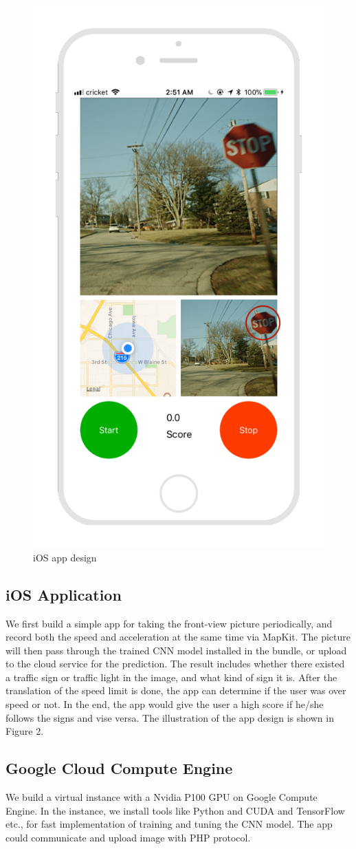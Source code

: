 \documentclass{article}
\begin{document}
\begin{figure}
\begin{minipage}{.4\textwidth}
    \includegraphics[width=.6\linewidth]{iOS_design.png}
    \caption{iOS app design}
    \label{fig:fig_2}
  \end{minipage}
\end{figure}
\subsection{iOS Application}
We first build a simple app for taking the front-view picture periodically, and record both the speed and acceleration at the same time via MapKit. The picture will then pass through the trained CNN model installed in the bundle, or upload to the cloud service for the prediction. The result includes whether there existed a traffic sign or traffic light in the image, and what kind of sign it is. After the translation of the speed limit is done, the app can determine if the user was over speed or not. In the end, the app would give the user a high score if he/she follows the signs and vise versa. The illustration of the app design is shown in Figure 2.

\subsection{Google Cloud Compute Engine}
We build a virtual instance with a Nvidia P100 GPU on Google Compute Engine. In the instance, we install tools like Python and CUDA and TensorFlow etc., for fast implementation of training and tuning the CNN model. The app could communicate and upload image with PHP protocol.
\end{document}
